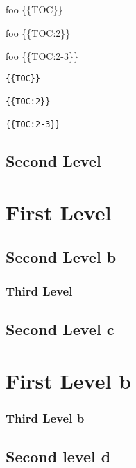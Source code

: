 
\def\mytitle{Table of Contents}


\tableofcontents

\setcounter{tocdepth}{0}
\tableofcontents

\setcounter{tocdepth}{1}
\tableofcontents

foo \{\{TOC\}\}

foo \{\{TOC:2\}\}

foo \{\{TOC:2-3\}\}

\begin{verbatim}
{{TOC}}

{{TOC:2}}

{{TOC:2-3}}
\end{verbatim}

\chapter{Second Level}
\label{secondlevel}

\tableofcontents

\part{First Level}
\label{firstlevel}

\chapter{Second Level b}
\label{secondlevelb}

\section{Third Level}
\label{thirdlevel}

\chapter{Second Level c}
\label{secondlevelc}

\part{First Level b}
\label{firstlevelb}

\section{Third Level b}
\label{thirdlevelb}

\chapter{Second level d}
\label{secondleveld}


